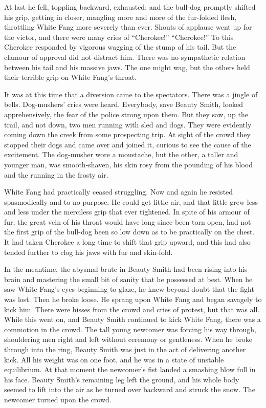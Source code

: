 \documentclass[10pt]{book}
\begin{document}
At last he fell, toppling backward, exhausted; and the bull-dog
promptly shifted his grip, getting in closer, mangling more and more of
the fur-folded flesh, throttling White Fang more severely than ever.
Shouts of applause went up for the victor, and there were many cries of
“Cherokee!” “Cherokee!” To this Cherokee responded by vigorous wagging
of the stump of his tail. But the clamour of approval did not distract
him. There was no sympathetic relation between his tail and his massive
jaws. The one might wag, but the others held their terrible grip on
White Fang’s throat.

It was at this time that a diversion came to the spectators. There was
a jingle of bells. Dog-mushers’ cries were heard. Everybody, save
Beauty Smith, looked apprehensively, the fear of the police strong upon
them. But they saw, up the trail, and not down, two men running with
sled and dogs. They were evidently coming down the creek from some
prospecting trip. At sight of the crowd they stopped their dogs and
came over and joined it, curious to see the cause of the excitement.
The dog-musher wore a moustache, but the other, a taller and younger
man, was smooth-shaven, his skin rosy from the pounding of his blood
and the running in the frosty air.

White Fang had practically ceased struggling. Now and again he resisted
spasmodically and to no purpose. He could get little air, and that
little grew less and less under the merciless grip that ever tightened.
In spite of his armour of fur, the great vein of his throat would have
long since been torn open, had not the first grip of the bull-dog been
so low down as to be practically on the chest. It had taken Cherokee a
long time to shift that grip upward, and this had also tended further
to clog his jaws with fur and skin-fold.

In the meantime, the abysmal brute in Beauty Smith had been rising into
his brain and mastering the small bit of sanity that he possessed at
best. When he saw White Fang’s eyes beginning to glaze, he knew beyond
doubt that the fight was lost. Then he broke loose. He sprang upon
White Fang and began savagely to kick him. There were hisses from the
crowd and cries of protest, but that was all. While this went on, and
Beauty Smith continued to kick White Fang, there was a commotion in the
crowd. The tall young newcomer was forcing his way through, shouldering
men right and left without ceremony or gentleness. When he broke
through into the ring, Beauty Smith was just in the act of delivering
another kick. All his weight was on one foot, and he was in a state of
unstable equilibrium. At that moment the newcomer’s fist landed a
smashing blow full in his face. Beauty Smith’s remaining leg left the
ground, and his whole body seemed to lift into the air as he turned
over backward and struck the snow. The newcomer turned upon the crowd.
\end{document}
